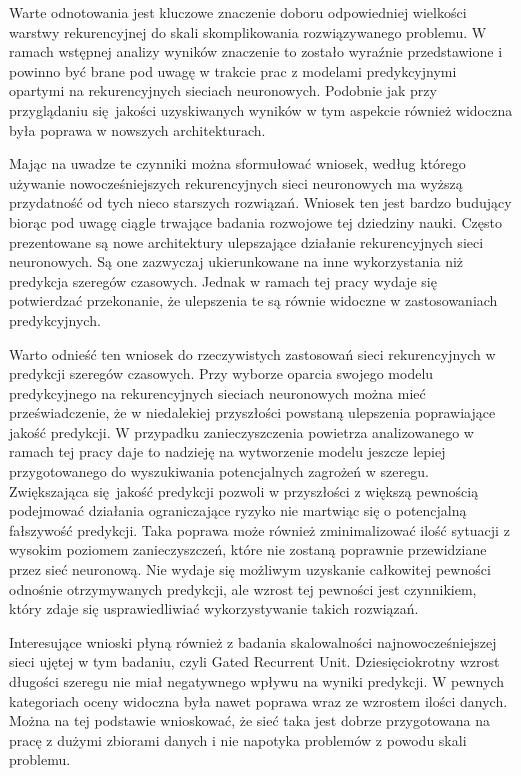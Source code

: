 \documentclass[10pt,a4paper]{article}
\begin{document}
Warte odnotowania jest kluczowe znaczenie doboru odpowiedniej wielkości warstwy rekurencyjnej do skali skomplikowania rozwiązywanego problemu. W ramach wstępnej analizy wyników znaczenie to zostało wyraźnie przedstawione i powinno być brane pod uwagę w trakcie prac z modelami predykcyjnymi opartymi na rekurencyjnych sieciach neuronowych. Podobnie jak przy przyglądaniu się jakości uzyskiwanych wyników w tym aspekcie również widoczna była poprawa w nowszych architekturach. 

Mając na uwadze te czynniki można sformułować wniosek, według którego używanie nowocześniejszych rekurencyjnych sieci neuronowych ma wyższą przydatność od tych nieco starszych rozwiązań. Wniosek ten jest bardzo budujący biorąc pod uwagę ciągle trwające badania rozwojowe tej dziedziny nauki. Często prezentowane są nowe architektury ulepszające działanie rekurencyjnych sieci neuronowych. Są one zazwyczaj ukierunkowane na inne wykorzystania niż predykcja szeregów czasowych. Jednak w ramach tej pracy wydaje się potwierdzać przekonanie, że ulepszenia te są równie widoczne w zastosowaniach predykcyjnych. 

Warto odnieść ten wniosek do rzeczywistych zastosowań sieci rekurencyjnych w predykcji szeregów czasowych. Przy wyborze oparcia swojego modelu predykcyjnego na rekurencyjnych sieciach neuronowych można mieć przeświadczenie, że w niedalekiej przyszłości powstaną ulepszenia poprawiające jakość predykcji. W przypadku zanieczyszczenia powietrza analizowanego w ramach tej pracy daje to nadzieję na wytworzenie modelu jeszcze lepiej przygotowanego do wyszukiwania potencjalnych zagrożeń w szeregu. Zwiększająca się jakość predykcji pozwoli w przyszłości z większą pewnością podejmować działania ograniczające ryzyko nie martwiąc się o potencjalną fałszywość predykcji. Taka poprawa może również zminimalizować ilość sytuacji z wysokim poziomem zanieczyszczeń, które nie zostaną poprawnie przewidziane przez sieć neuronową. Nie wydaje się możliwym uzyskanie całkowitej pewności odnośnie otrzymywanych predykcji, ale wzrost tej pewności jest czynnikiem, który zdaje się usprawiedliwiać wykorzystywanie takich rozwiązań. 

Interesujące wnioski płyną również z badania skalowalności najnowocześniejszej sieci ujętej w tym badaniu, czyli Gated Recurrent Unit. Dziesięciokrotny wzrost długości szeregu nie miał negatywnego wpływu na wyniki predykcji. W pewnych kategoriach oceny widoczna była nawet poprawa wraz ze wzrostem ilości danych. Można na tej podstawie wnioskować, że sieć taka jest dobrze przygotowana na pracę z dużymi zbiorami danych i nie napotyka problemów z powodu skali problemu.
\end{document}
